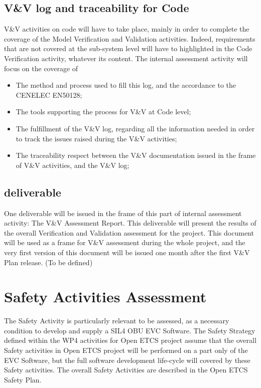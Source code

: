 \documentclass{template/openetcs_article}
\begin{document}
\subsection{V\&V log and traceability for Code}
V\&V activities on code will have to take place, mainly in order to complete the coverage of the Model Verification and Validation activities. Indeed, requirements that are not covered at the sub-system level will have to highlighted in the Code Verification activity, whatever its content.
The internal assessment activity will focus on the coverage of
\begin{itemize}
\item The method and process used to fill this log, and the accordance to the CENELEC EN50128;
\item The tools supporting the process for V\&V at Code level;
\item The fulfillment of the V\&V log, regarding all the information needed in order to track the issues raised during the V\&V activities;
\item The traceability respect between the V\&V documentation issued in the frame of V\&V activities, and the V\&V log;
\end{itemize}

\subsection{deliverable}
One deliverable will be issued in the frame of this part of internal assessment activity: The V\&V Assessment Report. This deliverable will present the results of the overall Verification and Validation assessment for the project.
This document will be used as a frame for V\&V assessment during the whole project, and the very first version of this document will be issued one month after the first V\&V Plan release. (To be defined)

\section{Safety Activities Assessment}
The Safety Activity is particularly relevant to be assessed, as a necessary condition to develop and supply a SIL4 OBU EVC Software. The Safety Strategy defined within the WP4 activities for Open ETCS project assume that the overall Safety activities in Open ETCS project will be performed on a part only of the EVC Software, but the full software development life-cycle will covered by these Safety activities.
The overall Safety Activities are described in the Open ETCS Safety Plan.
\end{document}
